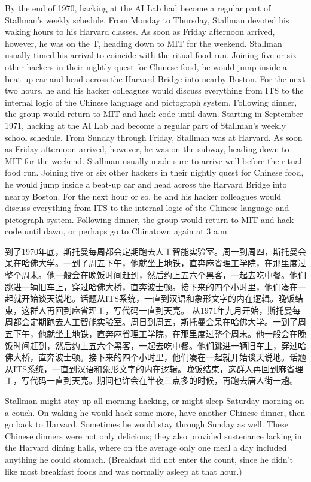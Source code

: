\ifdefined\eng
\ifdefined\vone
By the end of 1970, hacking at the AI Lab had become a regular part of Stallman's weekly schedule. From Monday to Thursday, Stallman devoted his waking hours to his Harvard classes. As soon as Friday afternoon arrived, however, he was on the T, heading down to MIT for the weekend. Stallman usually timed his arrival to coincide with the ritual food run. Joining five or six other hackers in their nightly quest for Chinese food, he would jump inside a beat-up car and head across the Harvard Bridge into nearby Boston. For the next two hours, he and his hacker colleagues would discuss everything from ITS to the internal logic of the Chinese language and pictograph system. Following dinner, the group would return to MIT and hack code until dawn.
\fi
\ifdefined\vtwo
Starting in September 1971, hacking at the AI Lab had become a regular part of Stallman's weekly school schedule. From Sunday through Friday, Stallman was at Harvard. As soon as Friday afternoon arrived, however, he was on the subway, heading down to MIT for the weekend. Stallman usually made sure to arrive well before the ritual food run. Joining five or six other hackers in their nightly quest for Chinese food, he would jump inside a beat-up car and head across the Harvard Bridge into nearby Boston. For the next hour or so, he and his hacker colleagues would discuss everything from ITS to the internal logic of the Chinese language and pictograph system. Following dinner, the group would return to MIT and hack code until dawn, or perhaps go to Chinatown again at 3 a.m.
\fi
\fi

\ifdefined\chs
\ifdefined\vone
到了1970年底，斯托曼每周都会定期跑去人工智能实验室。周一到周四，斯托曼会呆在哈佛大学。一到了周五下午，他就坐上地铁，直奔麻省理工学院，在那里度过整个周末。他一般会在晚饭时间赶到，然后约上五六个黑客，一起去吃中餐。他们跳进一辆旧车上，穿过哈佛大桥，直奔波士顿。接下来的四个小时里，他们凑在一起就开始谈天说地。话题从ITS系统，一直到汉语和象形文字的内在逻辑。晚饭结束，这群人再回到麻省理工，写代码一直到天亮。
\fi
\ifdefined\vtwo
从1971年九月开始，斯托曼每周都会定期跑去人工智能实验室。周日到周五，斯托曼会呆在哈佛大学。一到了周五下午，他就坐上地铁，直奔麻省理工学院，在那里度过整个周末。他一般会在晚饭时间赶到，然后约上五六个黑客，一起去吃中餐。他们跳进一辆旧车上，穿过哈佛大桥，直奔波士顿。接下来的四个小时里，他们凑在一起就开始谈天说地。话题从ITS系统，一直到汉语和象形文字的内在逻辑。晚饭结束，这群人再回到麻省理工，写代码一直到天亮。期间也许会在半夜三点多的时候，再跑去唐人街一趟。
\fi
\fi

\ifdefined\vtwo
\ifdefined\eng
Stallman might stay up all morning hacking, or might sleep Saturday morning on a couch. On waking he would hack some more, have another Chinese dinner, then go back to Harvard.  Sometimes he would stay through Sunday as well.  These Chinese dinners were not only delicious; they also provided sustenance lacking in the Harvard dining halls, where on the average only one meal a day included anything he could stomach. (Breakfast did not enter the count, since he didn't like most breakfast foods and was normally asleep at that hour.)
\fi

